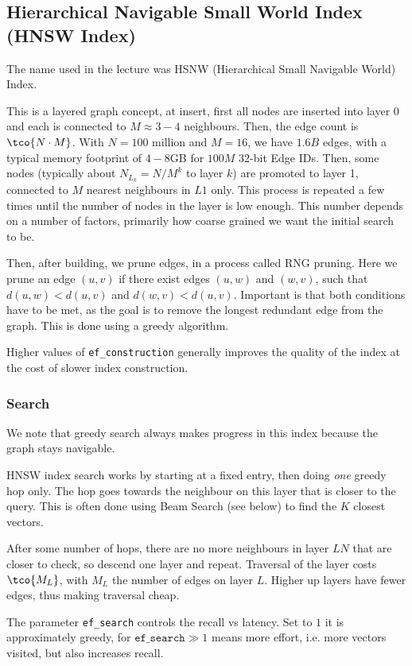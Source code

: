 \subsection{Hierarchical Navigable Small World Index (HNSW Index)}
The name used in the lecture was HSNW (Hierarchical Small Navigable World) Index.

This is a layered graph concept, at insert, first all nodes are inserted into layer 0 and each is connected to $M \approx 3 - 4$ neighbours.
Then, the edge count is $\tco{N \cdot M}$. With $N = 100$ million and $M = 16$, we have $1.6B$ edges, with a typical memory footprint of $4-8$GB for $100M$ 32-bit Edge IDs.
Then, some nodes (typically about $N_{L_k} = N / M^k$ to layer $k$) are promoted to layer 1, connected to $M$ nearest neighbours in $L1$ only.
This process is repeated a few times until the number of nodes in the layer is low enough.
This number depends on a number of factors, primarily how coarse grained we want the initial search to be.

Then, after building, we prune edges, in a process called RNG pruning.
Here we prune an edge $(u, v)$ if there exist edges $(u, w)$ and $(w, v)$, such that $d(u, w) < d(u, v)$ and $d(w, v) < d(u, v)$.
Important is that both conditions have to be met, as the goal is to remove the longest redundant edge from the graph.
This is done using a greedy algorithm.

Higher values of \texttt{ef\_construction} generally improves the quality of the index at the cost of slower index construction.


\subsubsection{Search}
We note that greedy search always makes progress in this index because the graph stays navigable.

HNSW index search works by starting at a fixed entry, then doing \textit{one} greedy hop only.
The hop goes towards the neighbour on this layer that is closer to the query.
This is often done using Beam Search (see below) to find the $K$ closest vectors.

After some number of hops, there are no more neighbours in layer $LN$ that are closer to check, so descend one layer and repeat.
Traversal of the layer costs $\tco{M_L}$, with $M_L$ the number of edges on layer $L$.
Higher up layers have fewer edges, thus making traversal cheap.

The parameter \texttt{ef\_search} controls the recall vs latency.
Set to $1$ it is approximately greedy, for $\texttt{ef\_search} \gg 1$ means more effort, i.e. more vectors visited,
but also increases recall.


